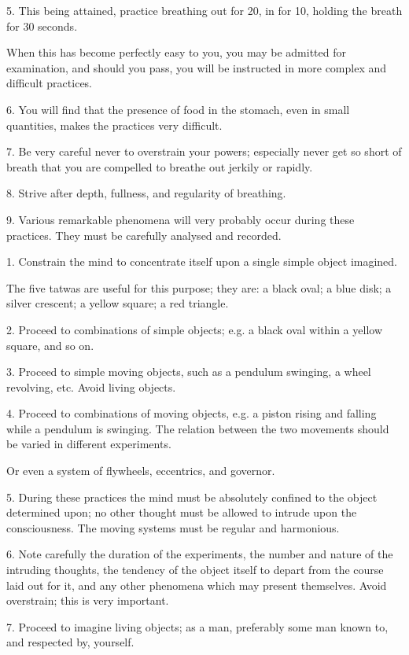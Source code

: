 5. This being attained, practice breathing out for 20, in for 10, holding the breath for 30 seconds.

When this has become perfectly easy to you, you may be admitted for examination, and should you pass, you will be instructed in more complex and difficult practices.

6. You will find that the presence of food in the stomach, even in small quantities, makes the practices very difficult.

7. Be very careful never to overstrain your powers; especially never get so short of breath that you are compelled to breathe out jerkily or rapidly.

8. Strive after depth, fullness, and regularity of breathing.

9. Various remarkable phenomena will very probably occur during these practices. They must be carefully analysed and recorded.



1. Constrain the mind to concentrate itself upon a single simple object imagined.

The five tatwas are useful for this purpose; they are: a black oval; a blue disk; a silver crescent; a yellow square; a red triangle.

2. Proceed to combinations of simple objects; e.g. a black oval within a yellow square, and so on.

3. Proceed to simple moving objects, such as a pendulum swinging, a wheel revolving, etc. Avoid living objects.

4. Proceed to combinations of moving objects, e.g. a piston rising and falling while a pendulum is swinging. The relation between the two movements should be varied in different experiments.

Or even a system of flywheels, eccentrics, and governor.

5. During these practices the mind must be absolutely confined to the object determined upon; no other thought must be allowed to intrude upon the consciousness. The moving systems must be regular and harmonious.

6. Note carefully the duration of the experiments, the number and nature of the intruding thoughts, the tendency of the object itself to depart from the course laid out for it, and any other phenomena which may present themselves. Avoid overstrain; this is very important.

7. Proceed to imagine living objects; as a man, preferably some man known to, and respected by, yourself.


